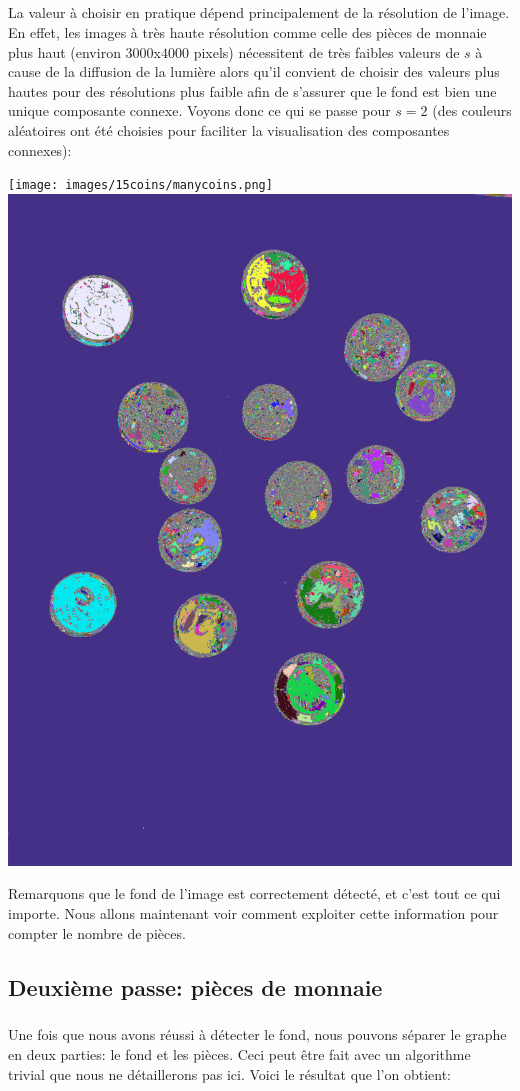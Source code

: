 \subparagraph{}
La valeur à choisir en pratique dépend principalement de la résolution de l'image. En effet, les images à très haute résolution comme celle des pièces de monnaie plus haut (environ $3000$x$4000$ pixels) nécessitent de très faibles valeurs de $s$ à cause de la diffusion de la lumière alors qu'il convient de choisir des valeurs plus hautes pour des résolutions plus faible afin de s'assurer que le fond est bien une unique composante connexe. Voyons donc ce qui se passe pour $s=2$ (des couleurs aléatoires ont été choisies pour faciliter la visualisation des composantes connexes):

\begin{center}
\texttt{[image: images/15coins/manycoins.png]}
\includegraphics[width=0.4\linewidth]{images/15coins/out_manycolors.png}
\end{center}

Remarquons que le fond de l'image est correctement détecté, et c'est tout ce qui importe. Nous allons maintenant voir comment exploiter cette information pour compter le nombre de pièces.

\subsection{Deuxième passe: pièces de monnaie}
\subparagraph{}
Une fois que nous avons réussi à détecter le fond, nous pouvons séparer le graphe en deux parties: le fond et les pièces. Ceci peut être fait avec un algorithme trivial que nous ne détaillerons pas ici. Voici le résultat que l'on obtient:

